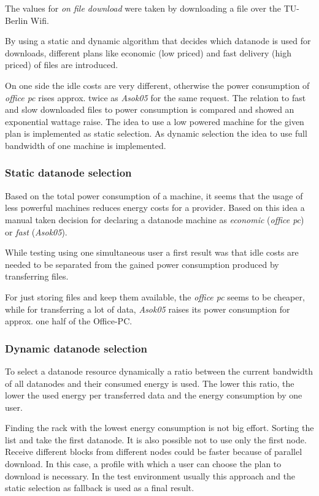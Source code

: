 The values for \textit{on file download} were taken by downloading a file over the TU-Berlin Wifi.

By using a static and dynamic algorithm that decides which datanode is used for downloads, different plans like economic (low priced) and fast delivery (high priced) of files are introduced.

On one side the idle costs are very different, otherwise the power consumption of \textit{office pc} rises approx. twice as \textit{Asok05} for the same request. The relation to fast and slow downloaded files to power consumption is compared and showed an exponential wattage raise. The idea to use a low powered machine for the given plan is implemented as static selection. As dynamic selection the idea to use full bandwidth of one machine is implemented.

\subsubsection{Static datanode selection}

Based on the total power consumption of a machine, it seems that the usage of less powerful machines reduces energy costs for a provider. Based on this idea a manual taken decision for declaring a datanode machine as \textit{economic} (\textit{office pc}) or \textit{fast} (\textit{Asok05}). 

While testing using one simultaneous user a first result was that idle costs are needed to be separated from the gained power consumption produced by transferring files. 

For just storing files and keep them available, the \textit{office pc} seems to be cheaper, while for transferring a lot of data, \textit{Asok05} raises its power consumption for approx. one half of the Office-PC.

\subsubsection{Dynamic datanode selection}

To select a datanode resource dynamically a ratio between the current bandwidth of all datanodes and their consumed energy is used. The lower this ratio, the lower the used energy per transferred data and the energy consumption by one user.

Finding the rack with the lowest energy consumption is not big effort. Sorting the list and take the first datanode. It is also possible not to use only the first node. Receive different blocks from different nodes could be faster because of parallel download. In this case, a profile with which a user can choose the plan to download is necessary. In the test environment usually this approach and the static selection as fallback is used as a final result.

